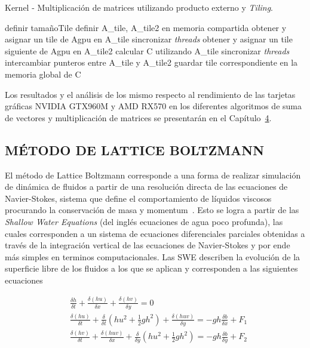 \begin{algorithm}
\caption{Kernel - Multiplicación de matrices utilizando producto externo y \textit{Tiling}.}
\label{alg:6}
\begin{algorithmic}[1]
\State definir tamañoTile
\State definir A\_tile, A\_tile2 en memoria compartida
\State obtener y asignar un tile de Agpu en A\_tile
\State sincronizar \textit{threads}
    \State obtener y asignar un tile siguiente de Agpu en A\_tile2
    \State calcular C utilizando A\_tile
    \State sincronizar \textit{threads}
    \State intercambiar punteros entre A\_tile y A\_tile2
\EndFor
\State guardar tile correspondiente en la memoria global de C
\EndProcedure
\end{algorithmic}
\end{algorithm}

Los resultados y el análisis de los mismo respecto al rendimiento de las tarjetas gráficas NVIDIA GTX960M y AMD RX570 en los diferentes algoritmos de suma de vectores y multiplicación de matrices se presentarán en el Capítulo~\hyperref[sec:4]{4}. 

\subsection{MÉTODO DE LATTICE BOLTZMANN}

El método de Lattice Boltzmann corresponde a una forma de realizar simulación de dinámica de fluidos a partir de una resolución directa de las ecuaciones de Navier-Stokes, sistema que define el comportamiento de líquidos viscosos procurando la conservación de masa y momentum~\cite{paperB}. 
Esto se logra a partir de las \textit{Shallow Water Equations} (del inglés ecuaciones de agua poco profunda), las cuales corresponden a un sistema de ecuaciones diferenciales parciales obtenidas a través de la integración vertical de las ecuaciones de Navier-Stokes y por ende más simples en terminos computacionales. Las SWE describen la evolución de la superficie libre de los fluidos a los que se aplican y corresponden a las siguientes ecuaciones

\begin{align}
    & \frac{\delta h}{\delta t} + \frac{\delta(hu)}{\delta x} + \frac{\delta(hv)}{\delta y} = 0 \\
    & \frac{\delta(hu)}{\delta t} + \frac{\delta}{\delta t} \left( hu^2 + \frac{1}{2}gh^2 \right) + \frac{\delta(huv)}{\delta y} = -gh\frac{\delta b}{\delta x} + F_1 \\
    & \frac{\delta(hv)}{\delta t} + \frac{\delta(huv)}{\delta x} + \frac{\delta}{\delta y}\left( hu^2 + \frac{1}{2}gh^2 \right) = -gh\frac{\delta b}{\delta y} + F_2
\end{align}



